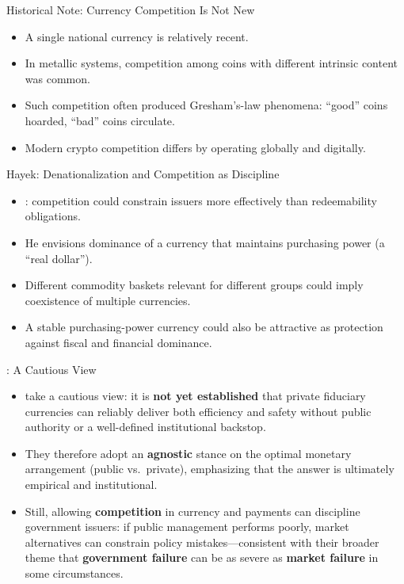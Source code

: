 \documentclass[11pt,aspectratio=169]{beamer}
\begin{document}
\begin{frame}{Historical Note: Currency Competition Is Not New}
\small
\begin{itemize}
  \item A single national currency is relatively recent.
  \item In metallic systems, competition among coins with different intrinsic content was common.
  \item Such competition often produced Gresham’s-law phenomena:
  ``good'' coins hoarded, ``bad'' coins circulate.
  \item Modern crypto competition differs by operating globally and digitally.
\end{itemize}
\end{frame}

\begin{frame}{Hayek: Denationalization and Competition as Discipline}
\small
\begin{itemize}
  \item \textcite{Hayek1976Denationalization}: competition could constrain issuers more effectively than redeemability obligations.
  \item He envisions dominance of a currency that maintains purchasing power (a ``real dollar'').
  \item Different commodity baskets relevant for different groups could imply coexistence of multiple currencies.
  \item A stable purchasing-power currency could also be attractive as protection against fiscal and financial dominance.
\end{itemize}
\end{frame}

\begin{frame}{\textcite{friedmanschwartz1986}: A Cautious View}
\small
\begin{itemize}
  \item \textcite{friedmanschwartz1986} take a cautious view: it is \textbf{not yet established} that private fiduciary currencies can reliably deliver both efficiency and safety without public authority or a well-defined institutional backstop.
  \item They therefore adopt an \textbf{agnostic} stance on the optimal monetary arrangement (public vs.\ private), emphasizing that the answer is ultimately empirical and institutional.
  \item Still, allowing \textbf{competition} in currency and payments can discipline government issuers: if public management performs poorly, market alternatives can constrain policy mistakes—consistent with their broader theme that \textbf{government failure} can be as severe as \textbf{market failure} in some circumstances.
\end{itemize}
\end{frame}
\end{document}
